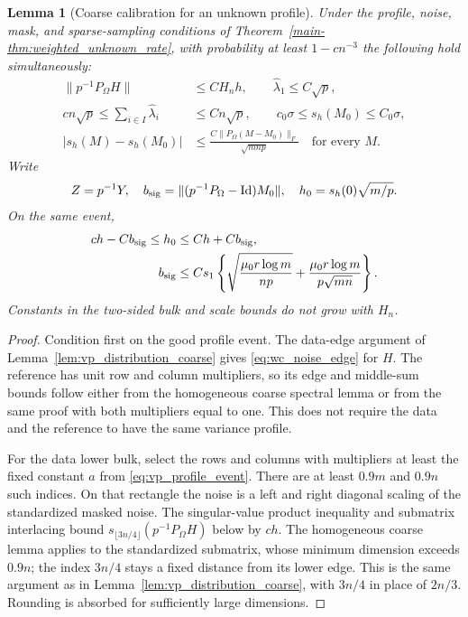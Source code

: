 \documentclass[numsec,webpdf,modern,large,namedate]{oup-authoring-template}
\theoremstyle{plain}
\newtheorem{slemma}{Lemma}%
\theoremstyle{remark}
\newif\ifmarkchanges
\newenvironment{revision}{\begingroup\ifmarkchanges\color{red}\fi}{\endgroup}
\begin{document}
\begin{revision}
\begin{slemma}[Coarse calibration for an unknown profile]
\label{lem:wc_coarse}
Under the profile, noise, mask, and sparse-sampling conditions of
Theorem~\ref{main-thm:weighted_unknown_rate}, with probability at least
$1-cn^{-3}$ the following hold simultaneously:
\begin{align}
 \|p^{-1}P_\Omega H\|&\le C H_n h,\qquad
 \widehat\lambda_1\le C\sqrt p,\label{eq:wc_noise_edge}\\
 cn\sqrt p\le\sum_{i\in I}\widehat\lambda_i&\le Cn\sqrt p,
 \qquad c_0\sigma\le s_h(M_0)\le C_0\sigma,
 \label{eq:wc_bulk_scale}\\
 |s_h(M)-s_h(M_0)|
 &\le\frac{C\|P_\Omega(M-M_0)\|_F}{\sqrt{mnp}}
 \quad\text{for every }M.
 \label{eq:wc_scale_uniform}
\end{align}
Write
\begin{align*}
 Z=p^{-1}Y,
 \quad b_{\rm sig}=\|(p^{-1}P_\Omega-\operatorname{Id})M_0\|,
 \quad h_0=s_h(0)\sqrt{m/p}.
\end{align*}
On the same event,
\begin{align}
 ch-Cb_{\rm sig}\le h_0&\le Ch+Cb_{\rm sig},
 \label{eq:wc_raw_scale}\\
 b_{\rm sig}&\le Cs_1\left\{
 \sqrt{\frac{\mu_0r\log m}{np}}+
 \frac{\mu_0r\log m}{p\sqrt{mn}}\right\}.
 \label{eq:wc_signal_mask}
\end{align}
Constants in the two-sided bulk and scale bounds do not grow with $H_n$.
\end{slemma}
\begin{proof}
Condition first on the good profile event. The data-edge argument of
Lemma~\ref{lem:vp_distribution_coarse} gives
\eqref{eq:wc_noise_edge} for $H$. The reference has unit row and column
multipliers, so its edge and middle-sum bounds follow either from the
homogeneous coarse spectral lemma or from the same proof with both
multipliers equal to one. This does not require the data and the
reference to have the same variance profile.

For the data lower bulk, select the rows and columns with multipliers at
least the fixed constant $a$ from \eqref{eq:vp_profile_event}. There are
at least $0.9m$ and $0.9n$ such indices. On that rectangle the noise is a
left and right diagonal scaling of the standardized masked noise.
The singular-value product inequality and submatrix interlacing bound
$s_{\lfloor3n/4\rfloor}(p^{-1}P_\Omega H)$ below by $ch$.
The homogeneous coarse lemma applies to the standardized submatrix,
whose minimum dimension exceeds $0.9n$; the index $3n/4$ stays a fixed
distance from its lower edge. This is the same argument as in
Lemma~\ref{lem:vp_distribution_coarse}, with $3n/4$ in place of $2n/3$.
Rounding is absorbed for sufficiently large dimensions.


\end{proof}
\end{revision}
\end{document}
